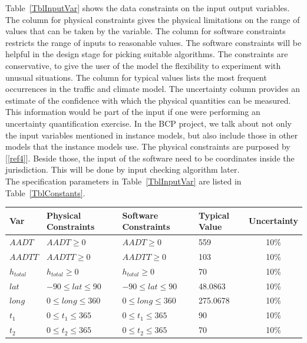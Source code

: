 \documentclass[12pt]{article}
\newcommand{\reref}[1]{\ref{#1}}
\begin{document}
Table~\ref{TblInputVar} shows the data constraints on the input output
variables. The column for physical constraints gives the physical limitations
on the range of values that can be taken by the variable. The column for
software constraints restricts the range of inputs to reasonable values. The software constraints will be helpful in the design stage for picking suitable
algorithms.  The constraints are conservative, to give the user of the model the
flexibility to experiment with unusual situations. The column for typical values lists the most frequent occurrences in the traffic and climate model. The uncertainty column
provides an estimate of the confidence with which the physical quantities can be
measured.  This information would be part of the input if one were performing an uncertainty quantification exercise. In the BCP project, we talk about not only the input variables mentioned in instance models, but also include those in other models that the instance models use. The physical constraints are purposed by [\reref{ref4}]. Beside those, the input of the software need to be coordinates inside the jurisdiction. This will be done by input checking algorithm later. \\
The specification parameters in Table~\ref{TblInputVar} are listed in
Table~\ref{TblConstants}.

\begin{table}[!h]
  \caption{Input Variables} \label{TblInputVar}
  \renewcommand{\arraystretch}{1.2}
\noindent \begin{longtable*}{l l l l c} 
  \toprule
  \textbf{Var} & \textbf{Physical Constraints} & \textbf{Software Constraints} &
                             \textbf{Typical Value} & \textbf{Uncertainty}\\
  \midrule 
  $AADT$ & $AADT \ge 0$ & $AADT \ge 0$ & 559 & 10\%  \\
  $AADTT$ & $AADTT \ge 0$ & $AADTT \ge 0$ & 103  & 10\%
  \\
  $h_{total}$ & $h_{total} \ge 0$ & $h_{total} \ge 0$ &  70  & 10\%
  \\
  $lat$ & $-90 \leq lat \leq 90$ & $-90 \leq lat \leq 90$ & 48.0863 & 10\%
  \\
  $long$ & $0 \leq long \leq 360$ & $0 \leq long \leq 360$ &  275.0678 & 10\%
  \\
  $t_1$ & $0 \leq t_1 \leq 365$ & $0 \leq t_1 \leq 365$ &  90  & 10\%
  \\
  $t_2$ & $0 \leq t_2 \leq 365$ & $0 \leq t_2 \leq 365$ &  70  & 10\%
  \\
  \bottomrule
\end{longtable*}
\end{table}
\end{document}
